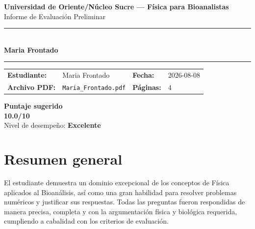 \documentclass[11pt,a4paper]{article}
\begin{document}
\begin{center}
  {\Large\bfseries\color{azulTitulo} Universidad de Oriente/Núcleo Sucre --- Física para Bioanalistas}\\[4pt]
  {\large Informe de Evaluación Preliminar}\\[12pt]
  \rule{\linewidth}{1.2pt}\\[6pt]
  {\LARGE\bfseries Maria Frontado}\\[4pt]
  \rule{\linewidth}{0.6pt}
\end{center}

\vspace{4pt}
\begin{tcolorbox}[cajaTitulo, title=Datos del informe]
\begin{tabular}{@{}llll@{}}
  \textbf{Estudiante:}  & Maria Frontado  &
  \textbf{Fecha:}       & 2026-08-08 \\[4pt]
  \textbf{Archivo PDF:} & \texttt{Maria\_Frontado.pdf}  &
  \textbf{Páginas:}     & 4 \\
\end{tabular}
\end{tcolorbox}

\vspace{6pt}
\begin{center}
  \begin{tcolorbox}[
    enhanced,
    colback=white, colframe=desempeno_excelente,
    width=0.62\linewidth,
    boxrule=2pt,
    halign=center, valign=center,
    top=8pt, bottom=8pt,
  ]
    \centering
    {\large\bfseries Puntaje sugerido}\\[6pt]
    {\Huge\bfseries\color{desempeno_excelente} 10.0/10}\\[6pt]
    {\large Nivel de desempeño: \textbf{\color{desempeno_excelente} Excelente}}
  \end{tcolorbox}
\end{center}

\section*{Resumen general}
El estudiante demuestra un dominio excepcional de los conceptos de Física aplicados al Bioanálisis, así como una gran habilidad para resolver problemas numéricos y justificar sus respuestas. Todas las preguntas fueron respondidas de manera precisa, completa y con la argumentación física y biológica requerida, cumpliendo a cabalidad con los criterios de evaluación.
\end{document}
